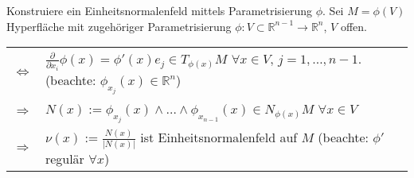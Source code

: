 \begin{example}
	Konstruiere ein Einheitsnormalenfeld mittels Parametrisierung $\phi$. Sei $M = \phi(V)$ Hyperfläche mit zugehöriger Parametrisierung $\phi\colon V\subset\mathbb{R}^{n-1}\to\mathbb{R}^n$, $V$ offen.\\\begin{tabularx}{\linewidth}{r@{$\;\,$}X}
		$\Leftrightarrow$ & $\frac{\partial}{\partial x_i}\phi(x) = \phi'(x) e_j \in T_{\phi(x)} M$ $\forall x\in V$, $j=1,\dotsc,n-1$. (beachte: $\phi_{x_j}(x)\in\mathbb{R}^n$) \\
		$\Rightarrow$ & $N(x) := \phi_{x_j}(x)\land \dotsc\land \phi_{x_{n-1}}(x)\in N_{\phi(x)} M$ $\forall x\in V$ \\
		$\Rightarrow$ & $\nu(x) := \frac{N(x)}{\vert N(x)\vert}$ ist Einheitsnormalenfeld auf $M$ (beachte: $\phi'$ regulär $\forall x$)
	\end{tabularx}
\end{example}